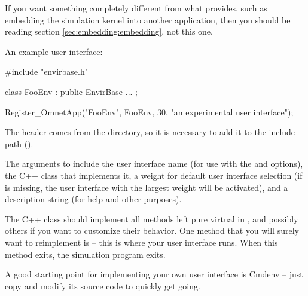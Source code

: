 \begin{note}
If you want something completely different from what 
provides, such as embedding the simulation kernel into another
application, then you should be reading section \ref{sec:embedding:embedding},
not this one.
\end{note}

An example user interface:

\begin{cpp}
#include "envirbase.h"

class FooEnv : public EnvirBase
{
    ...
};

Register_OmnetApp("FooEnv", FooEnv, 30, "an experimental user interface");
\end{cpp}

The  header comes from the  directory,
so it is necessary to add it to the include path ().

The arguments to  include the user interface name
(for use with the  and  options),
the C++ class that implements it, a weight for default user interface selection
(if  is missing, the user interface with the largest weight will be
activated), and a description string (for help and other purposes).

The C++ class should implement all methods left pure virtual in
, and possibly others if you want to customize
their behavior. One method that you will surely want to reimplement is
 -- this is where your user interface runs. When this method
exits, the simulation program exits.

\begin{note}
A good starting point for implementing your own user interface is
Cmdenv -- just copy and modify its source code to quickly get going.
\end{note}


